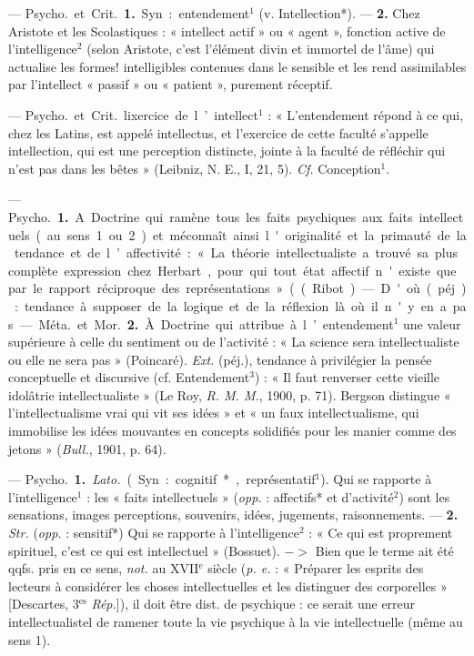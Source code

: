 \begin{itemize}[leftmargin=1cm, label=, itemsep=1pt]
 — \si{Psycho.} et \si{Crit.} {\bf 1.} Syn. :
entendement$^1$ (v. Intellection*). —
 {\bf 2.} Chez Aristote et les Scolastiques :
« intellect actif » ou « agent »,
fonction active de l'intelligence$^2$ (selon Aristote, c’est l'élément divin et
immortel de l’âme) qui actualise les
formes! intelligibles contenues dans
le sensible et les rend assimilables
par l'intellect « passif » ou « patient », purement réceptif.

 — \si{Psycho.} et \si{Crit.} lixercice de l’intellect$^1$ : « L’entendement
répond à ce qui, chez les Latins,
est appelé intellectus, et l'exercice
de cette faculté s’appelle intellection,
qui est une perception distincte,
jointe à la faculté de réfléchir
qui n’est pas dans les bêtes »
(Leibniz, N. E., I, 21, 5). {\it {\it Cf.}} Conception$^1$.

 — \si{Psycho.} {\bf 1.} A.
Doctrine qui ramène tous les faits
psychiques aux faits intellectuels
(au sens 1 ou 2) et méconnaît ainsi
l'originalité et la primauté de la
tendance et de l’affectivité : « La
théorie intellectualiste a trouvé sa
plus complète expression chez Herbart, pour qui tout état affectif
n'existe que par le rapport réciproque
des représentations » ((Ribot).
— D'où (péj.) : tendance à supposer
de la logique et de la réflexion là où
il n'y en a pas.

— \si{Méta.} et \si{Mor.} {\bf 2.} À. Doctrine
qui attribue à l’entendement$^1$ une
valeur supérieure à celle du sentiment ou de l’activité : « La science
sera intellectualiste ou elle ne sera
pas » (Poincaré). {\it Ext.} (péj.), tendance à privilégier la pensée conceptuelle et discursive (cf. Entendement$^3$) : « Il faut renverser cette
vieille idolâtrie intellectualiste »
(Le Roy, {\it R. M. M.}, 1900, p. 71).
Bergson distingue « l’intellectualisme vrai qui vit ses idées » et « un
faux intellectualisme, qui immobilise les idées mouvantes en concepts
solidifiés pour les manier comme
des jetons » ({\it Bull.}, 1901, p. 64).

 — \si{Psycho.} {\bf 1.} {\it Lato.} (Syn. :
cognitif*, représentatif$^1$). Qui se rapporte à l'intelligence$^1$ : les « faits
intellectuels » ({\it opp.} : affectifs* et
d'activité$^2$) sont les sensations, images
perceptions, souvenirs, idées, jugements, raisonnements. — {\bf 2.} {\it Str.}
({\it opp.} : sensitif*) Qui se rapporte à
l'intelligence$^2$ : « Ce qui est proprement spirituel, c’est ce qui est intellectuel » (Bossuet). $->$ Bien que le
terme ait été qqfs. pris en ce sens,
{\it not.} au {\footnotesize XVII}$^\text{e}$ siècle ({\it p. e.} : « Préparer
les esprits des lecteurs à considérer
les choses intellectuelles et les distinguer des corporelles » [Descartes,
3$^\text{es}$ {\it Rép.}]), il doit être dist. de psychique : ce serait une erreur intellectualistel de ramener toute la vie
psychique à la vie intellectuelle
(même au sens 1).


\end{itemize}
